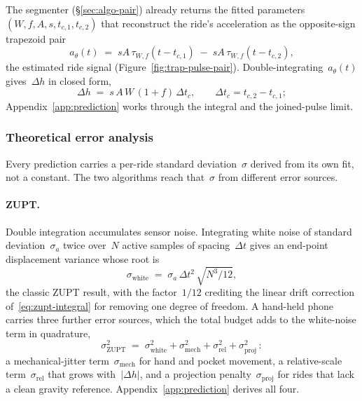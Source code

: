 \documentclass[manuscript,review,screen]{acmart}
\begin{document}
The segmenter (\S\ref{sec:algo-pair}) already returns the fitted
parameters~$(W,f,A,s,t_{c,1},t_{c,2})$ that reconstruct the ride's
acceleration as the opposite-sign trapezoid pair
\begin{equation}
  a_\theta(t) \;=\; sA\,\tau_{W,f}(t-t_{c,1})
                 \;-\; sA\,\tau_{W,f}(t-t_{c,2}),
  \label{eq:trap-signal}
\end{equation}
the estimated ride signal (Figure~\ref{fig:trap-pulse-pair}).
Double-integrating~$a_\theta(t)$ gives~$\Delta h$ in closed form,
\begin{equation}
  \Delta h \;=\; s\,A\,W\,(1+f)\,\Delta t_c,
  \qquad \Delta t_c=t_{c,2}-t_{c,1};
  \label{eq:dh-closed}
\end{equation}
Appendix~\ref{app:prediction} works through the integral and the
joined-pulse limit.

\subsubsection{Theoretical error analysis}
\label{sec:algo-error}

Every prediction carries a per-ride standard deviation~$\sigma$
derived from its own fit, not a constant.  The two algorithms reach
that~$\sigma$ from different error sources.

\paragraph{ZUPT.}
Double integration accumulates sensor noise.  Integrating white noise
of standard deviation~$\sigma_a$ twice over~$N$ active samples of
spacing~$\Delta t$ gives an end-point displacement variance whose
root is
\begin{equation}
  \sigma_{\mathrm{white}}
   \;=\; \sigma_a\,\Delta t^{2}\,\sqrt{N^{3}/12},
  \label{eq:sigma-zupt}
\end{equation}
the classic ZUPT result, with the factor~$1/12$ crediting the linear
drift correction of~\eqref{eq:zupt-integral} for removing one degree
of freedom.  A hand-held phone carries three further error sources,
which the total budget adds to the white-noise term in quadrature,
\begin{equation}
  \sigma_{\mathrm{ZUPT}}^{2}
   \;=\;\sigma_{\mathrm{white}}^{2}
        +\sigma_{\mathrm{mech}}^{2}
        +\sigma_{\mathrm{rel}}^{2}
        +\sigma_{\mathrm{proj}}^{2}\,:
  \label{eq:sigma-zupt-total}
\end{equation}
a mechanical-jitter term~$\sigma_{\mathrm{mech}}$ for hand and pocket
movement, a relative-scale term~$\sigma_{\mathrm{rel}}$ that grows
with~$|\Delta h|$, and a projection penalty~$\sigma_{\mathrm{proj}}$
for rides that lack a clean gravity reference.
Appendix~\ref{app:prediction} derives all four.
\end{document}
